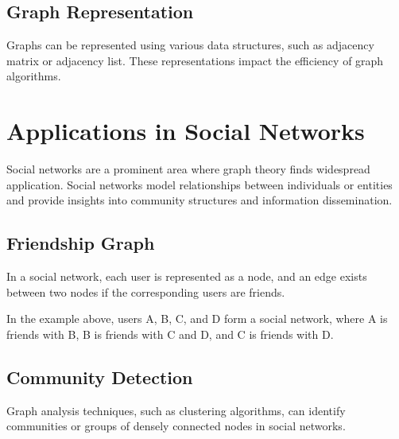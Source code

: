 \documentclass{article}
\begin{document}
\subsection{Graph Representation}
Graphs can be represented using various data structures, such as adjacency matrix or adjacency list. These representations impact the efficiency of graph algorithms.

\section{Applications in Social Networks}
Social networks are a prominent area where graph theory finds widespread application. Social networks model relationships between individuals or entities and provide insights into community structures and information dissemination.

\subsection{Friendship Graph}
In a social network, each user is represented as a node, and an edge exists between two nodes if the corresponding users are friends.

\begin{center}
\end{center}

In the example above, users A, B, C, and D form a social network, where A is friends with B, B is friends with C and D, and C is friends with D.

\subsection{Community Detection}
Graph analysis techniques, such as clustering algorithms, can identify communities or groups of densely connected nodes in social networks.

\begin{center}
\end{center}
\end{document}
